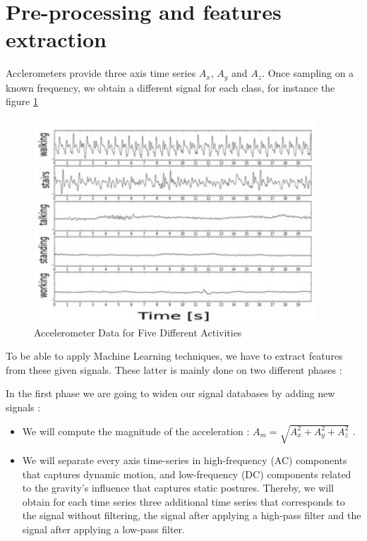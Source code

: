 \documentclass[11pt,a4paper,oneside]{article}
\begin{document}
\section{Pre-processing and features extraction}
\label{pre}
Acclerometers provide three axis time series $A_x$, $A_y$ and $A_z$. Once sampling on a known frequency, we obtain a different signal for each class, for instance the figure \ref{fig-signals}

\begin{figure}[ht!]
\begin{center}
\includegraphics[scale=.7]{signals}
\caption{Accelerometer Data for Five Different Activities \cite{mannini}}
\label{fig-signals}
\end{center}
\end{figure}
To be able to apply Machine Learning techniques, we have to extract features from these given signals. These latter is mainly done on two different phases :

In the first phase we are going to widen our signal databases by adding new signals :
\begin{itemize}

\item We will compute the magnitude of the acceleration : $A_m = \sqrt{A_x^2 + A_y^2 + A_z^2}$ \cite{casale}. 
\item We will separate every axis time-series in high-frequency (AC) components that captures dynamic motion, and low-frequency (DC) components related to the gravity's influence that captures static postures.  	Thereby, we will obtain for each time series three additional time series that corresponds to the signal without filtering, the signal after applying a high-pass filter and the signal after applying a low-pass filter.
\end{itemize}
\end{document}
